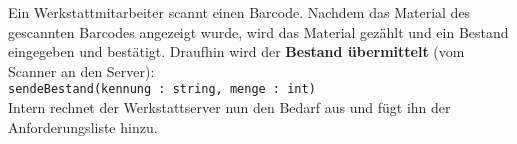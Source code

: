Ein Werkstattmitarbeiter scannt einen Barcode. Nachdem das Material des gescannten Barcodes angezeigt wurde, wird das Material gezählt und ein Bestand eingegeben und bestätigt. Draufhin wird der \textbf{Bestand übermittelt} (vom Scanner an den Server):\\
\medskip
\texttt{sendeBestand(kennung : string, menge : int)}
\\
\medskip
Intern rechnet der Werkstattserver nun den Bedarf aus und fügt ihn der Anforderungsliste hinzu.